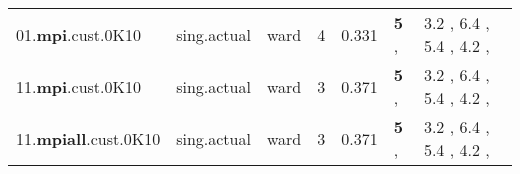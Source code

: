 \begin{table*}[]
{\begin{tabular}{|l|l|l|c|r|l|l|}
 01.\textbf{mpi}.cust.0K10    & sing.actual  & ward          &        4 &     0.331 & \textbf{5} ,                & 3.2 , 6.4 , 5.4 , 4.2 ,       \\
 11.\textbf{mpi}.cust.0K10    & sing.actual  & ward          &        3 &     0.371 & \textbf{5} ,                & 3.2 , 6.4 , 5.4 , 4.2 ,       \\
 11.\textbf{mpiall}.cust.0K10 & sing.actual  & ward          &        3 &     0.371 & \textbf{5} ,                & 3.2 , 6.4 , 5.4 , 4.2 ,       \\
\hline
\end{tabular}}
\end{table*}
